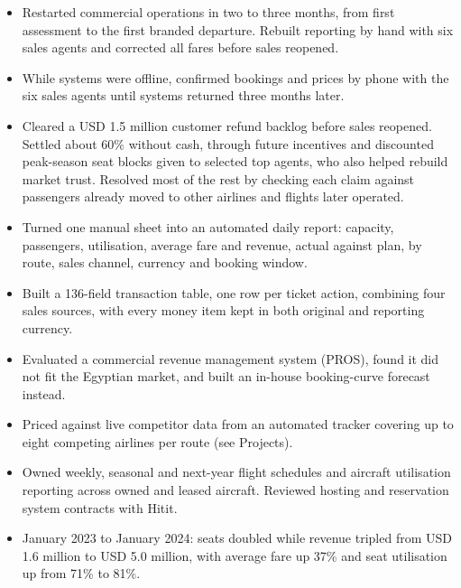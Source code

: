 \begin{itemize}
  \item Restarted commercial operations in two to three months, from first assessment to the first branded departure. Rebuilt reporting by hand with six sales agents and corrected all fares before sales reopened.
  \item While systems were offline, confirmed bookings and prices by phone with the six sales agents until systems returned three months later.
  \item Cleared a USD 1.5 million customer refund backlog before sales reopened. Settled about 60\% without cash, through future incentives and discounted peak-season seat blocks given to selected top agents, who also helped rebuild market trust. Resolved most of the rest by checking each claim against passengers already moved to other airlines and flights later operated.
  \item Turned one manual sheet into an automated daily report: capacity, passengers, utilisation, average fare and revenue, actual against plan, by route, sales channel, currency and booking window.
  \item Built a 136-field transaction table, one row per ticket action, combining four sales sources, with every money item kept in both original and reporting currency.
  \item Evaluated a commercial revenue management system (PROS), found it did not fit the Egyptian market, and built an in-house booking-curve forecast instead.
  \item Priced against live competitor data from an automated tracker covering up to eight competing airlines per route (see Projects).
  \item Owned weekly, seasonal and next-year flight schedules and aircraft utilisation reporting across owned and leased aircraft. Reviewed hosting and reservation system contracts with Hitit.
  \item January 2023 to January 2024: seats doubled while revenue tripled from USD 1.6 million to USD 5.0 million, with average fare up 37\% and seat utilisation up from 71\% to 81\%.
\end{itemize}

